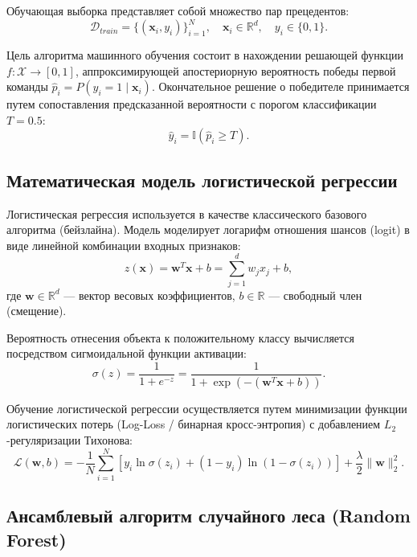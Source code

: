 \documentclass[14pt, a4paper]{extarticle}
\begin{document}
Обучающая выборка представляет собой множество пар прецедентов:
\begin{equation}
\mathcal{D}_{train} = \{(\mathbf{x}_i, y_i)\}_{i=1}^{N}, \quad \mathbf{x}_i \in \mathbb{R}^d, \quad y_i \in \{0, 1\}.
\end{equation}

Цель алгоритма машинного обучения состоит в нахождении решающей функции $f: \mathcal{X} \to [0, 1]$, аппроксимирующей апостериорную вероятность победы первой команды $\hat{p}_i = P(y_i = 1 \mid \mathbf{x}_i)$. Окончательное решение о победителе принимается путем сопоставления предсказанной вероятности с порогом классификации $T = 0.5$:
\begin{equation}
\hat{y}_i = \mathbb{I}(\hat{p}_i \ge T).
\end{equation}

\subsection{Математическая модель логистической регрессии}

Логистическая регрессия используется в качестве классического базового алгоритма (бейзлайна). Модель моделирует логарифм отношения шансов (logit) в виде линейной комбинации входных признаков:
\begin{equation}
z(\mathbf{x}) = \mathbf{w}^T \mathbf{x} + b = \sum_{j=1}^d w_j x_j + b,
\end{equation}
где $\mathbf{w} \in \mathbb{R}^d$ --- вектор весовых коэффициентов, $b \in \mathbb{R}$ --- свободный член (смещение).

Вероятность отнесения объекта к положительному классу вычисляется посредством сигмоидальной функции активации:
\begin{equation}
\sigma(z) = \frac{1}{1 + e^{-z}} = \frac{1}{1 + \exp\left(-(\mathbf{w}^T \mathbf{x} + b)\right)}.
\end{equation}

Обучение логистической регрессии осуществляется путем минимизации функции логистических потерь (Log-Loss / бинарная кросс-энтропия) с добавлением $L_2$-регуляризации Тихонова:
\begin{equation}
\mathcal{L}(\mathbf{w}, b) = -\frac{1}{N} \sum_{i=1}^N \left[ y_i \ln \sigma(z_i) + (1 - y_i) \ln(1 - \sigma(z_i)) \right] + \frac{\lambda}{2} \|\mathbf{w}\|_2^2.
\end{equation}

\subsection{Ансамблевый алгоритм случайного леса (Random Forest)}
\end{document}
